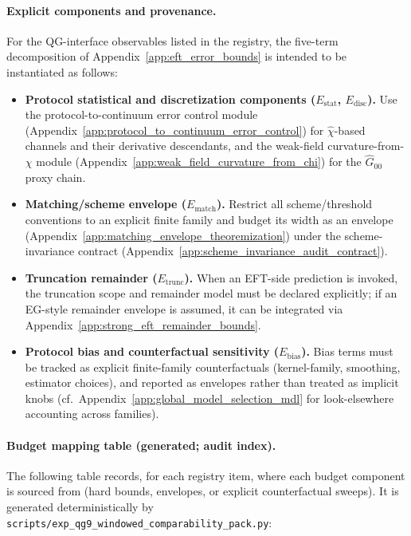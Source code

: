 \paragraph{Explicit components and provenance.}
\AuditTag For the QG-interface observables listed in the registry, the five-term decomposition of Appendix~\ref{app:eft_error_bounds}
is intended to be instantiated as follows:
\begin{itemize}
\item \textbf{Protocol statistical and discretization components ($E_{\mathrm{stat}}$, $E_{\mathrm{disc}}$).}
  Use the protocol-to-continuum error control module (Appendix~\ref{app:protocol_to_continuum_error_control})
  for $\widehat\chi$-based channels and their derivative descendants, and the weak-field curvature-from-$\chi$ module
  (Appendix~\ref{app:weak_field_curvature_from_chi}) for the $\widehat G_{00}$ proxy chain.
\item \textbf{Matching/scheme envelope ($E_{\mathrm{match}}$).}
  Restrict all scheme/threshold conventions to an explicit finite family and budget its width as an envelope
  (Appendix~\ref{app:matching_envelope_theoremization}) under the scheme-invariance contract (Appendix~\ref{app:scheme_invariance_audit_contract}).
\item \textbf{Truncation remainder ($E_{\mathrm{trunc}}$).}
  When an EFT-side prediction is invoked, the truncation scope and remainder model must be declared explicitly;
  if an EG-style remainder envelope is assumed, it can be integrated via Appendix~\ref{app:strong_eft_remainder_bounds}.
\item \textbf{Protocol bias and counterfactual sensitivity ($E_{\mathrm{bias}}$).}
  Bias terms must be tracked as explicit finite-family counterfactuals (kernel-family, smoothing, estimator choices),
  and reported as envelopes rather than treated as implicit knobs (cf.\ Appendix~\ref{app:global_model_selection_mdl} for
  look-elsewhere accounting across families).
\end{itemize}

\paragraph{Budget mapping table (generated; audit index).}
\AuditTag The following table records, for each registry item, where each budget component is sourced from
(hard bounds, envelopes, or explicit counterfactual sweeps). It is generated deterministically by
\texttt{scripts/exp\_qg9\_windowed\_comparability\_pack.py}:


